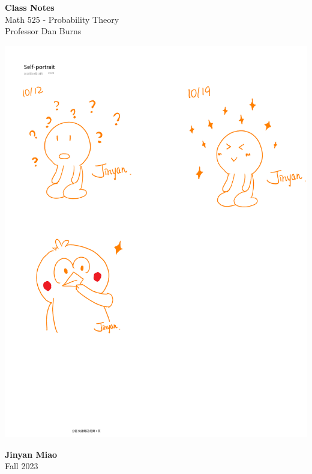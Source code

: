 \documentclass[11pt, onesided]{book}
\theoremstyle{break}
\theoremstyle{break}
\begin{document}
	\begin{titlepage}
		\begin{center}
			\vspace*{0.5cm}
			\Huge \color{red}
				\textbf{Class Notes}\\
			\vspace{0.5cm}			
			\Large \color{black}
			Math 525 - Probability Theory\\
			Professor Dan Burns
			\vspace{1.5cm}

			\includegraphics[scale=1.15]{hmm.pdf}
			
			
			\vspace{2cm}
			\LARGE
				\textbf{Jinyan Miao}\\
				\hfill\break
				\LARGE Fall 2023\\
			\vspace{1cm}

		\vspace*{\fill}
		\end{center}			
	\end{titlepage}
\end{document}
